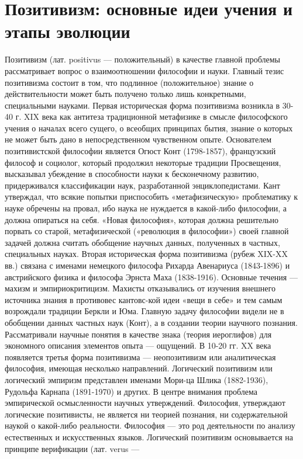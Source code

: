 \documentclass[12pt]{article}
\begin{document}
\section{Позитивизм: основные идеи учения и этапы эволюции}
Позитивизм (лат. positivus — положительный) в качестве главной проблемы рассматривает вопрос о
взаимоотношении философии и науки. Главный тезис позитивизма состоит в том, что подлинное
(положительное) знание о действительности может быть получено только лишь конкретными, специальными
науками.
Первая историческая форма позитивизма возникла в 30-40 г. XIX века как антитеза традиционной метафизике в
смысле философского учения о началах всего сущего, о всеобщих принципах бытия, знание о которых не может
быть дано в непосредственном чувственном опыте. Основателем позитивистской философии является Огюст
Конт (1798-1857), французский философ и социолог, который продолжил некоторые традиции Просвещения,
высказывал убеждение в способности науки к бесконечному развитию, придерживался классификации наук,
разработанной энциклопедистами.
Кант утверждал, что всякие попытки приспособить «метафизическую» проблематику к науке обречены на
провал, ибо наука не нуждается в какой-либо философии, а должна опираться на себя. «Новая философия»,
которая должна решительно порвать со старой, метафизической («революция в философии») своей главной
задачей должна считать обобщение научных данных, полученных в частных, специальных науках.
Вторая историческая форма позитивизма (рубеж XIX-XX вв.) связана с именами немецкого философа Рихарда
Авенариуса (1843-1896) и австрийского физика и философа Эрнста Маха (1838-1916). Основные течения —
махизм и эмпириокритицизм. Махисты отказывались от изучения внешнего источника знания в противовес
кантовс-кой идеи «вещи в себе» и тем самым возрождали традиции Беркли и Юма. Главную задачу философии
видели не в обобщении данных частных наук (Конт), а в создании теории научного познания. Рассматривали
научные понятия в качестве знака (теория иероглифов) для экономного описания элементов опыта —
ощущений.
В 10-20 гг. XX века появляется третья форма позитивизма — неопозитивизм или аналитическая философия,
имеющая несколько направлений.
Логический позитивизм или логический эмпиризм представлен именами Мори-ца Шлика (1882-1936), Рудольфа
Карнапа (1891-1970) и других. В центре внимания проблема эмпирической осмысленности научных
утверждений. Философия, утверждают логические позитивисты, не является ни теорией познания, ни
содержательной наукой о какой-либо реальности. Философия — это род деятельности по анализу естественных
и искусственных языков. Логический позитивизм основывается на принципе верификации (лат. verus —
\end{document}

